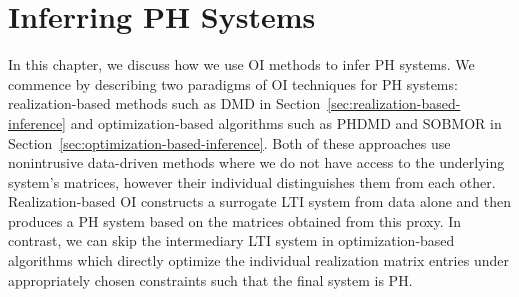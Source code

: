 \chapter[Inferring \texorpdfstring{\ac{PH} Systems}{PH}]{%
    Inferring \texorpdfstring{\acl{PH}}{Port-Hamiltonian} Systems
}\label{chap:inferring-models}

In this chapter, we discuss how we use \ac{OI} methods to infer \ac{PH} systems.
We commence by describing two paradigms of \ac{OI} techniques for \ac{PH} systems: realization-based methods such as \ac{DMD} in Section~\ref{sec:realization-based-inference} and optimization-based algorithms such as \ac{PHDMD} and \ac{SOBMOR} in Section~\ref{sec:optimization-based-inference}.
Both of these approaches use nonintrusive data-driven methods where we do not have access to the underlying system's matrices, however their individual distinguishes them from each other.
Realization-based \ac{OI} constructs a surrogate \ac{LTI} system from data alone and then produces a \ac{PH} system based on the matrices obtained from this proxy.
In contrast, we can skip the intermediary \ac{LTI} system in optimization-based algorithms which directly optimize the individual realization matrix entries under appropriately chosen constraints such that the final system is \ac{PH}.



